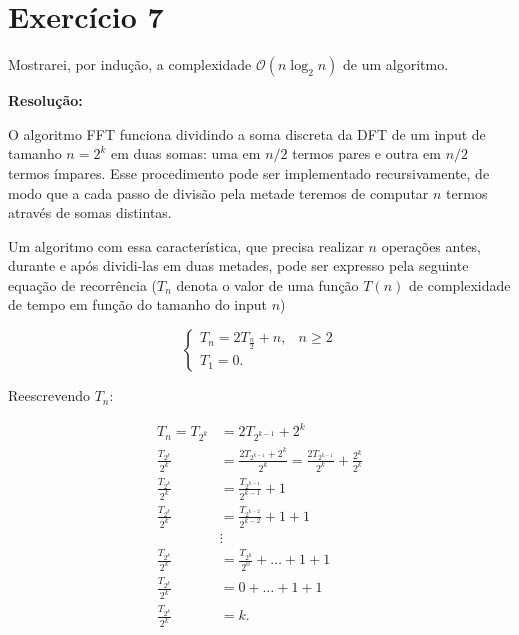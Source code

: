 
\section*{\large Exercício 7}
%

Mostrarei, por indução, a complexidade $\mathcal{O}(n\log_{2}{}n)$ de um algoritmo.

\textbf{Resolução:}

O algoritmo FFT funciona dividindo a soma discreta da DFT de um input de tamanho $n=2^{k}$ em duas somas: uma em $n/2$ termos pares e outra em $n/2$ termos ímpares. Esse procedimento pode ser implementado recursivamente, de modo que a cada passo de divisão pela metade teremos de computar $n$ termos através de somas distintas. 

Um algoritmo com essa característica, que precisa realizar $n$ operações antes, durante e após dividi-las em duas metades, pode ser expresso pela seguinte equação de recorrência ($T_{n}$ denota o valor de uma função $T(n)$ de complexidade de tempo em função do tamanho do input $n$)

\begin{equation*}
 \left\{ \begin{array}{rl} 
T_{n} = 2 T_{\frac{n}{2}} + n,  & n \geq 2  \\
T_{1} = 0.  & 
\end{array}\right.
\end{equation*}

Reescrevendo $T_{n}$:

\begin{align*}
T_{n} = T_{2^{k}} &= 2 T_{2^{k-1}} + 2^{k} \\[10pt]
 \frac{T_{2^{k}}}{2^{k}} &= \frac{2 T_{2^{k-1}} + 2^{k}}{2^{k}} = \frac{2 T_{2^{k-1}}}{2^{k}} + \frac{2^{k}}{2^{k}} \\[10pt]
 \frac{T_{2^{k}}}{2^{k}} &= \frac{T_{2^{k-1}}}{2^{k-1}} + 1 \\[10pt]
 \frac{T_{2^{k}}}{2^{k}} &= \frac{T_{2^{k-2}}}{2^{k-2}} + 1 + 1 \\
 &\vdots \\
 \frac{T_{2^{k}}}{2^{k}} &= \frac{T_{2^{0}}}{2^{0}} + \ldots + 1 + 1 \\[10pt]
 \frac{T_{2^{k}}}{2^{k}} &= 0 + \ldots + 1 + 1 \\[10pt]
 \frac{T_{2^{k}}}{2^{k}} &= k.
\end{align*}

